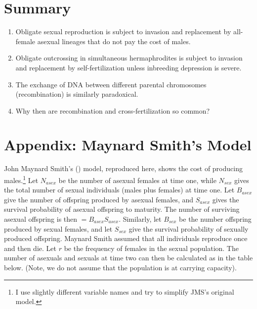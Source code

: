 \documentclass[
  american,
  letterpaper,
]{book}
\providecommand{\tightlist}{%
  \setlength{\itemsep}{0pt}\setlength{\parskip}{0pt}}\usepackage{longtable,booktabs,array}
\begin{document}
\section{Summary}\label{summary}

\begin{enumerate}
\def\labelenumi{\arabic{enumi}.}
\tightlist
\item
  Obligate sexual reproduction is subject to invasion and replacement by
  all-female asexual lineages that do not pay the cost of males.
\item
  Obligate outcrossing in simultaneous hermaphrodites is subject to
  invasion and replacement by self-fertilization unless inbreeding
  depression is severe.
\item
  The exchange of DNA between different parental chromosomes
  (recombination) is similarly paradoxical.
\item
  Why then are recombination and cross-fertilization so common?
\end{enumerate}

\section{Appendix: Maynard Smith's Model}\label{sec-app-1}

John Maynard Smith's () model,
reproduced here, shows the cost of producing males.\footnote{I use
  slightly different variable names and try to simplify JMS's original
  model.} Let \(N_{asex}\) be the number of asexual females at time one,
while \(N_{sex}\) gives the total number of sexual individuals (males
plus females) at time one. Let \(B_{asex}\) give the number of offspring
produced by asexual females, and \(S_{asex}\) gives the survival
probability of asexual offspring to maturity. The number of surviving
asexual offspring is then \(= B_{asex}S_{asex}\). Similarly, let
\(B_{sex}\) be the number offspring produced by sexual females, and let
\(S_{sex}\) give the survival probability of sexually produced
offspring. Maynard Smith assumed that all individuals reproduce once and
then die. Let \(r\) be the frequency of females in the sexual
population. The number of asexuals and sexuals at time two can then be
calculated as in the table below. (Note, we do not assume that the
population is at carrying capacity).
\end{document}
